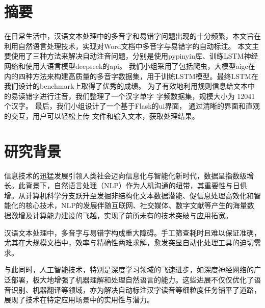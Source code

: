 \documentclass[12pt,hyperref,a4paper,UTF8]{ctexart}
\begin{document}
\cover

%
%

\thispagestyle{empty} %

\newpage
\tableofcontents

\newpage

\section{摘要}
在日常生活中，汉语文本处理中的多音字和易错字问题出现的十分频繁，本文旨在利用自然语言处理技术，实现对Word文档中多音字与易错字的自动标注。
本文主要使用了三种方法来解决自动注音问题，分别是使用pypinyin库、训练LSTM神经网络和使用大语言模型deepseek的api。
我们小组采用了包括爬虫，大模型aigc在内的四种方法来构建高质量的多音字数据集，用于训练LSTM模型。最终LSTM在我们设计的benchmark上取得了优秀的成绩。
为了有效地利用规则信息给文本中的易读错字进行注音，我们整理了一个汉字单字
字频数据集，规模大小为 12041 个汉字。
最后，我们小组设计了一个基于Flask的ui界面，
通过清晰的界面和直观的交互，用户可以轻松上传
文件和输入文本，获取处理结果。
\section{研究背景}
信息技术的迅猛发展引领人类社会迈向信息化与智能化新时代，数据呈指数级增长。此背景下，自然语言处理（NLP）作为人机沟通的纽带，其重要性与日俱增。从计算机科学分支跃升至发掘非结构化文本数据潜能、促信息处理高效化和智能化的核心技术，NLP的发展伴随互联网、社交媒体、数字文献等产生的海量数据激增及计算能力建设的飞越，实现了前所未有的技术突破与应用拓宽。

汉语文本处理中，多音字与易错字构成重大障碍。手工筛查耗时且难以保证准确，尤其在大规模文档中，效率与精确性两难求解，愈发突显自动化处理工具的迫切需求。

与此同时，人工智能技术，特别是深度学习领域的飞速进步，如深度神经网络的广泛部署，极大地增强了机器理解和处理自然语言的能力。这些进展不仅仅优化了语音识别、机器翻译等领域，亦为解决自动标注汉字读音等细粒度任务铺平了道路，展现了技术在特定应用场景中的实用性与潜力。
\end{document}
